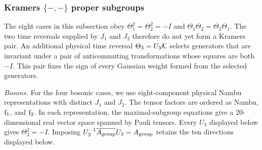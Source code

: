 \subsubsection*{\texorpdfstring{Kramers \(\{-,-\}\) proper subgroups}
{Kramers \{-,-\} proper subgroups}}

The eight cases in this subsection obey
\(\Theta_1^2=\Theta_2^2=-I\) and
\(\Theta_1\Theta_2=\Theta_2\Theta_1\).
The two time reversals supplied by \(J_1\) and \(J_2\) therefore do not yet
form a Kramers pair.  An additional physical time reversal
\(\Theta_3=U_3\mathcal{K}\) selects generators that are invariant under a pair of
anticommuting transformations whose squares are both \(-I\).  This pair fixes
the sign of every Gaussian weight formed from the selected generators.

\medskip\noindent\textit{Bosons.}\quad
For the four bosonic cases, we use eight-component physical Nambu
representations with distinct \(J_1\) and \(J_2\).  The tensor factors are
ordered as Nambu, \({\rm f}_1\), and \({\rm f}_2\).  In each representation,
the maximal-subgroup equations give a 20-dimensional real vector space
spanned by Pauli tensors.  Every \(U_3\) displayed below gives
\(\Theta_3^2=-I\).  Imposing
    \(U_3^{-1}\overline{A_{\rm group}}U_3=A_{\rm group}\) retains the ten
    directions displayed below.

